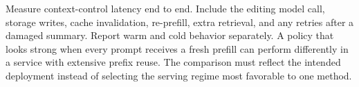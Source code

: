 Measure context-control latency end to end. Include the editing model call, storage writes, cache invalidation, re-prefill, extra retrieval, and any retries after a damaged summary. Report warm and cold behavior separately. A policy that looks strong when every prompt receives a fresh prefill can perform differently in a service with extensive prefix reuse. The comparison must reflect the intended deployment instead of selecting the serving regime most favorable to one method.

